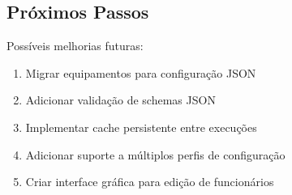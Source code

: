 \documentclass[11pt,a4paper]{article}
\begin{document}
\subsection{Próximos Passos}

Possíveis melhorias futuras:

\begin{enumerate}
    \item Migrar equipamentos para configuração JSON
    \item Adicionar validação de schemas JSON
    \item Implementar cache persistente entre execuções
    \item Adicionar suporte a múltiplos perfis de configuração
    \item Criar interface gráfica para edição de funcionários
\end{enumerate}
\end{document}
